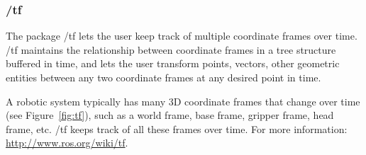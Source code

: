 \subsubsection{/tf}
\label{sec:tf}

The package /tf lets the user keep track of multiple coordinate frames over time. /tf maintains the relationship between coordinate frames in a tree structure buffered in time, and lets the user transform points, vectors, other geometric entities between any two coordinate frames at any desired point in time.

A robotic system typically has many 3D coordinate frames that change over time (see Figure~\ref{fig:tf}), such as a world frame, base frame, gripper frame, head frame, etc. /tf keeps track of all these frames over time.
For more information: \url{http://www.ros.org/wiki/tf}.

